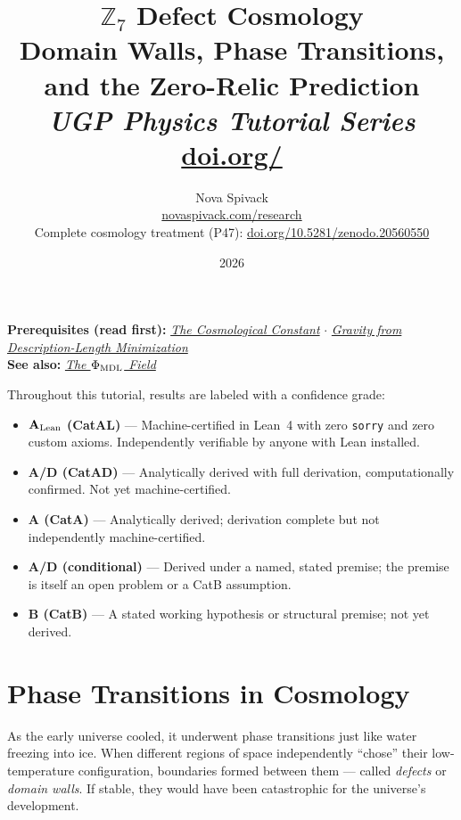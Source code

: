 \documentclass[11pt,a4paper]{article}
\title{\textbf{$\mathbb{Z}_7$ Defect Cosmology}\\[6pt]
\large Domain Walls, Phase Transitions, and the Zero-Relic Prediction\\[4pt]\normalsize\textit{UGP Physics Tutorial Series}
\\[2pt]\small\href{https://doi.org/\TutorialDOI}{doi.org/\TutorialDOI}}
\author{Nova Spivack\\[4pt]
\normalsize
\href{https://novaspivack.com/research}{novaspivack.com/research}\\[2pt]
\small Complete cosmology treatment (P47):
\href{https://doi.org/10.5281/zenodo.20560550}{doi.org/10.5281/zenodo.20560550}
}
\date{2026}
\begin{document}
\setcounter{tocdepth}{2}
\maketitle
\tableofcontents
\newpage

\begin{tcolorbox}[colback=blue!6,colframe=blue!40!black,
  title=\textbf{UGP Physics Tutorial Series}]
\textbf{Prerequisites (read first):} \href{https://doi.org/10.5281/zenodo.20657864}{\emph{The Cosmological Constant}} $\cdot$ \href{https://doi.org/10.5281/zenodo.20657870}{\emph{Gravity from Description-Length Minimization}}\\[4pt]
\textbf{See also:} \href{https://doi.org/10.5281/zenodo.20657885}{\emph{The $\Phi_{\rm MDL}$ Field}}
\end{tcolorbox}

\begin{tcolorbox}[colback=boxgreen,colframe=green!50!black,
  title=\textbf{Claim-Strength Taxonomy}]
Throughout this tutorial, results are labeled with a confidence grade:
\begin{itemize}[itemsep=2pt]
  \item \textbf{$\mathbf{A}_{\rm Lean}$ (CatAL)} --- Machine-certified in Lean~4 with zero \texttt{sorry} and zero custom axioms.  Independently verifiable by anyone with Lean installed.
  \item \textbf{A/D (CatAD)} --- Analytically derived with full derivation, computationally confirmed.  Not yet machine-certified.
  \item \textbf{A (CatA)} --- Analytically derived; derivation complete but not independently machine-certified.
  \item \textbf{A/D (conditional)} --- Derived under a named, stated premise; the premise is itself an open problem or a CatB assumption.
  \item \textbf{B (CatB)} --- A stated working hypothesis or structural premise; not yet derived.
\end{itemize}
\end{tcolorbox}


\section{Phase Transitions in Cosmology}

\begin{tcolorbox}[colback=boxblue,colframe=blue!40!black,title=The one-line answer]
As the early universe cooled, it underwent phase transitions just like water
freezing into ice. When different regions of space independently ``chose'' their
low-temperature configuration, boundaries formed between them --- called
\emph{defects} or \emph{domain walls}. If stable, they would have been
catastrophic for the universe's development.
\end{tcolorbox}
\end{document}
